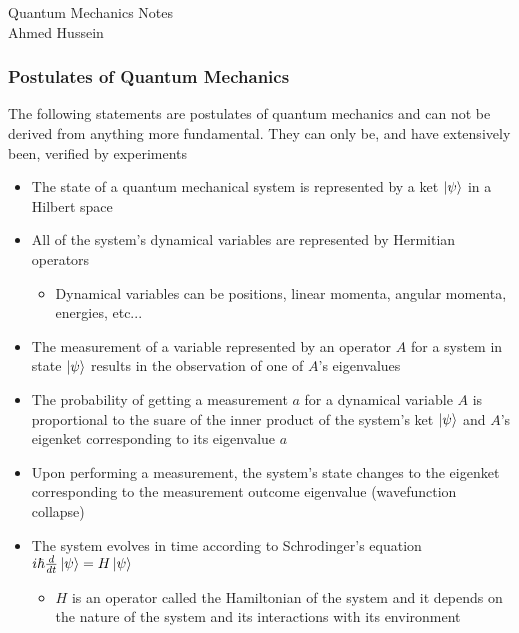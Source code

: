 \documentclass[8pt,t,mathserif,aspectratio=169]{beamer}
\newenvironment{nofootline}
{
    \setbeamertemplate{footline}{}
    \addtobeamertemplate{frametitle}{\vspace*{-0.9\baselineskip}}{}
}{}
\begin{document}
\begin{nofootline}
\begin{frame}
  \vspace{18mm}
  \begin{center}
  \Huge
  \textcolor{jhutext1}{Quantum Mechanics Notes} \\
  \LARGE
  \vspace{2mm}
  Ahmed Hussein \\
  \vspace{7mm}
  \end{center}
\end{frame}
\end{nofootline}

\begin{frame}
  \frametitle{Postulates of Quantum Mechanics}
  \vspace{1mm}
  The following statements are postulates of quantum mechanics and can not be derived from anything more fundamental. They can only be, and have extensively been, verified by experiments
  \begin{itemize}
    \item The state of a quantum mechanical system is represented by a ket $\ket{\psi}$ in a Hilbert space
    \item All of the system's dynamical variables are represented by Hermitian operators
    \begin{itemize}
      \item Dynamical variables can be positions, linear momenta, angular momenta, energies, etc...
    \end{itemize}
    \item The measurement of a variable represented by an operator $A$ for a system in state $\ket{\psi}$ results in the observation of one of $A$'s eigenvalues
    \item The probability of getting a measurement $a$ for a dynamical variable $A$ is proportional to the suare of the inner product of the system's ket $\ket{\psi}$ and $A$'s eigenket corresponding to its eigenvalue $a$
    \item Upon performing a measurement, the system's state changes to the eigenket corresponding to the measurement outcome eigenvalue (wavefunction collapse)
    \item The system evolves in time according to Schrodinger's equation $i \hbar {d \over dt} \ket{\psi} = H \ket{\psi}$
    \begin{itemize}
      \item $H$ is an operator called the Hamiltonian of the system and it depends on the nature of the system and its interactions with its environment
    \end{itemize}
  \end{itemize}
\end{frame}
\end{document}
